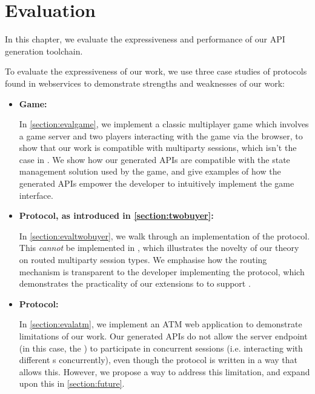 \chapter{Evaluation}
\label{chap:eval}

In this chapter, we
evaluate the expressiveness
and performance of our API generation
toolchain.


To evaluate the expressiveness
of our work,
we use three case studies
of protocols found in webservices
to demonstrate strengths and weaknesses
of our work:

\begin{itemize}

\item
\textbf{ Game:}

In \cref{section:evalgame},
we implement a classic multiplayer game which involves a game server
and two players interacting with the game via the browser,
to show that our work is compatible with multiparty sessions,
which isn't the case in \cite{MVU2020,Exceptional}.
We show how our generated APIs are compatible with the
state management solution used by the game, and give examples of 
how the generated APIs empower the developer to intuitively 
implement the game interface.

\item
\textbf{ Protocol, as introduced in \cref{section:twobuyer}:}

In \cref{section:evaltwobuyer},
we walk through an implementation of the 
protocol. This \textit{cannot} be implemented in
\cite{PureScript2019,MVU2020}, which illustrates the novelty
of our \newtheory theory on routed multiparty session types.
We emphasise how the routing mechanism is transparent to the
developer implementing the protocol, which demonstrates
the practicality of our extensions to \codegen to support
\newtheory.

\item
\textbf{ Protocol:}

In \cref{section:evalatm},
we implement an ATM web application to demonstrate
limitations of our work. Our generated APIs do not allow
the server endpoint (in this case, the )
to participate in concurrent sessions (i.e. interacting
with different s concurrently), even though
the protocol is written in a way that allows this.
However, we propose a way to address this limitation, and expand
upon this in \cref{section:future}.

\end{itemize}

